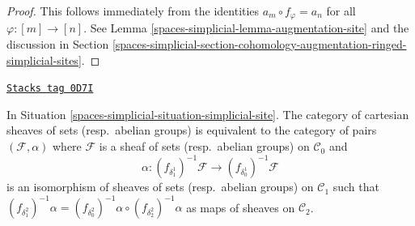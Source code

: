 \begin{proof}
This follows immediately from the identities
$a_m \circ f_\varphi = a_n$ for all $\varphi : [m] \to [n]$.
See Lemma \ref{spaces-simplicial-lemma-augmentation-site} and the discussion in
Section \ref{spaces-simplicial-section-cohomology-augmentation-ringed-simplicial-sites}.
\end{proof}

\begin{lemma}
\label{spaces-simplicial-lemma-characterize-cartesian}
\href{https://stacks.math.columbia.edu/tag/0D7I}{\texttt{Stacks tag 0D7I}}

In Situation \ref{spaces-simplicial-situation-simplicial-site}.
The category of cartesian sheaves of sets (resp.\ abelian groups)
is equivalent to the category of pairs $(\mathcal{F}, \alpha)$
where $\mathcal{F}$ is a sheaf of sets (resp.\ abelian groups)
on $\mathcal{C}_0$ and
$$
\alpha :
(f_{\delta_1^1})^{-1}\mathcal{F}
\longrightarrow (f_{\delta_0^1})^{-1}\mathcal{F}
$$
is an isomorphism of sheaves of sets (resp.\ abelian groups)
on $\mathcal{C}_1$ such that
$(f_{\delta^2_1})^{-1}\alpha =
(f_{\delta^2_0})^{-1}\alpha \circ (f_{\delta^2_2})^{-1}\alpha$
as maps of sheaves on $\mathcal{C}_2$.
\end{lemma}

